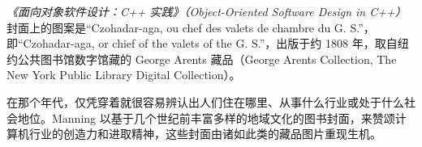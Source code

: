 \emph{《面向对象软件设计：C++ 实践》（Object-Oriented Software Design in C++）}封面上的图案是“Czohadar-aga, ou chef des valets de chambre du G. S.”，即“Czohadar-aga, or chief of the valets of the G. S.”，出版于约 1808 年，取自纽约公共图书馆数字馆藏的 George Arents 藏品（George Arents Collection, The New York Public Library Digital Collection）。

在那个年代，仅凭穿着就很容易辨认出人们住在哪里、从事什么行业或处于什么社会地位。Manning 以基于几个世纪前丰富多样的地域文化的图书封面，来赞颂计算机行业的创造力和进取精神，这些封面由诸如此类的藏品图片重现生机。
